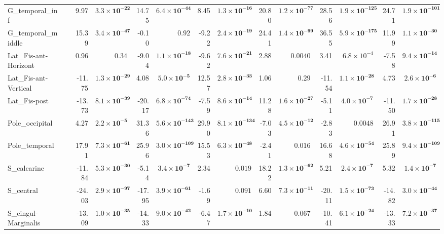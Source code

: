 {\begin{longtable}{llrrrrrrrrrrrr}
G\_temporal\_inf &  & 9.97 & $\mathbf{3.3{\times}10^{-22}}$ & 14.75 & $\mathbf{6.4{\times}10^{-44}}$ & 8.45 & $\mathbf{1.3{\times}10^{-16}}$ & 20.80 & $\mathbf{1.2{\times}10^{-77}}$ & 28.56 & $\mathbf{1.9{\times}10^{-125}}$ & 24.71 & $\mathbf{1.9{\times}10^{-101}}$ \\
G\_temporal\_middle &  & 15.39 & $\mathbf{3.4{\times}10^{-47}}$ & -0.10 & $0.92$ & -9.22 & $\mathbf{2.4{\times}10^{-19}}$ & 24.41 & $\mathbf{1.4{\times}10^{-99}}$ & 36.55 & $\mathbf{5.9{\times}10^{-175}}$ & 11.99 & $\mathbf{1.1{\times}10^{-30}}$ \\
Lat\_Fis-ant-Horizont &  & 0.96 & $0.34$ & -9.04 & $\mathbf{1.1{\times}10^{-18}}$ & -9.62 & $\mathbf{7.6{\times}10^{-21}}$ & 2.88 & $0.0040$ & 3.41 & $6.8{\times}10^{-4}$ & -7.58 & $\mathbf{9.4{\times}10^{-14}}$ \\
Lat\_Fis-ant-Vertical &  & -11.75 & $\mathbf{1.3{\times}10^{-29}}$ & 4.08 & $\mathbf{5.0{\times}10^{-5}}$ & 12.57 & $\mathbf{2.8{\times}10^{-33}}$ & 1.06 & $0.29$ & -11.54 & $\mathbf{1.1{\times}10^{-28}}$ & 4.73 & $\mathbf{2.6{\times}10^{-6}}$ \\
Lat\_Fis-post &  & -13.73 & $\mathbf{8.1{\times}10^{-39}}$ & -20.17 & $\mathbf{6.8{\times}10^{-74}}$ & -7.59 & $\mathbf{8.6{\times}10^{-14}}$ & 11.28 & $\mathbf{1.6{\times}10^{-27}}$ & -5.11 & $\mathbf{4.0{\times}10^{-7}}$ & -11.50 & $\mathbf{1.7{\times}10^{-28}}$ \\
Pole\_occipital &  & 4.27 & $\mathbf{2.2{\times}10^{-5}}$ & 31.36 & $\mathbf{5.6{\times}10^{-143}}$ & 29.90 & $\mathbf{8.1{\times}10^{-134}}$ & -7.03 & $\mathbf{4.5{\times}10^{-12}}$ & -2.83 & $0.0048$ & 26.91 & $\mathbf{3.8{\times}10^{-115}}$ \\
Pole\_temporal &  & 17.91 & $\mathbf{7.3{\times}10^{-61}}$ & 25.96 & $\mathbf{3.0{\times}10^{-109}}$ & 15.53 & $\mathbf{6.3{\times}10^{-48}}$ & -2.41 & $0.016$ & 16.68 & $\mathbf{4.6{\times}10^{-54}}$ & 25.89 & $\mathbf{9.4{\times}10^{-109}}$ \\
S\_calcarine &  & -11.84 & $\mathbf{5.3{\times}10^{-30}}$ & -5.14 & $\mathbf{3.4{\times}10^{-7}}$ & 2.34 & $0.019$ & 18.22 & $\mathbf{1.3{\times}10^{-62}}$ & 5.21 & $\mathbf{2.4{\times}10^{-7}}$ & 5.32 & $\mathbf{1.4{\times}10^{-7}}$ \\
S\_central &  & -24.03 & $\mathbf{2.9{\times}10^{-97}}$ & -17.95 & $\mathbf{3.9{\times}10^{-61}}$ & -1.69 & $0.091$ & 6.60 & $\mathbf{7.3{\times}10^{-11}}$ & -20.11 & $\mathbf{1.5{\times}10^{-73}}$ & -14.82 & $\mathbf{3.0{\times}10^{-44}}$ \\
S\_cingul-Marginalis &  & -13.09 & $\mathbf{1.0{\times}10^{-35}}$ & -14.33 & $\mathbf{9.0{\times}10^{-42}}$ & -6.47 & $\mathbf{1.7{\times}10^{-10}}$ & 1.84 & $0.067$ & -10.41 & $\mathbf{6.1{\times}10^{-24}}$ & -13.33 & $\mathbf{7.2{\times}10^{-37}}$ \\

\end{longtable}}
